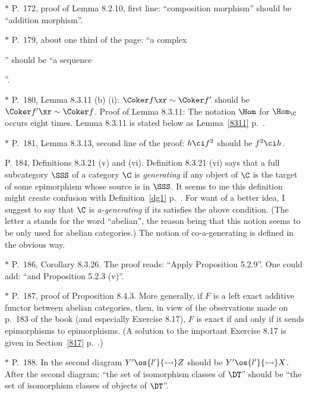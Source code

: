 \documentclass[12pt]{article}
\theoremstyle{remark}
\theoremstyle{definition}
\begin{document}
\nn$*$ P.~172, proof of Lemma 8.2.10, first line: ``composition morphism'' should be ``addition morphism''.

\nn$*$ P.~179, about one third of the page: ``a complex 
'' 
should be ``a sequence 
''.

\nn$*$ P.~180, Lemma 8.3.11 (b) (i): $\Coker f\xr\sim\Coker f'$ should be $\Coker f'\xr\sim\Coker f$. Proof of Lemma 8.3.11: The notation $\Hom$ for $\Hom_\C$ occurs eight times. Lemma 8.3.11 is stated below as Lemma~\ref{8311} p.~. 

\nn$*$ P.~181, Lemma 8.3.13, second line of the proof: $h\ci f^2$ should be $f^2\ci h$. 

\begin{s} 
P. 184, Definitions 8.3.21 (v) and (vi). Definition 8.3.21 (vi) says that a full subcategory $\SSS$ of a category $\C$ is \emph{generating} if any object of $\C$ is the target of some epimorphism whose source is in $\SSS$. It seems to me this definition might create confusion with Definition~\ref{dg1} p.~. For want of a better idea, I suggest to say that $\C$ is \emph{a-generating} if its satisfies the above condition. (The letter a stands for the word ``abelian'', the reason being that this notion seems to be only used for abelian categories.) The notion of co-a-generating is defined in the obvious way.
\end{s} 

\nn$*$ P.~186, Corollary 8.3.26. The proof reads: ``Apply Proposition 5.2.9''. One could add: ``and Proposition 5.2.3 (v)''.

\nn$*$ P.~187, proof of Proposition 8.4.3. More generally, if $F$ is a left exact additive functor between abelian categories, then, in view of the observations made on p.~183 of the book (and especially Exercise 8.17), $F$ is exact if and only if it sends epimorphisms to epimorphisms. (A solution to the important Exercise 8.17 is given in Section~\ref{817} p.~.)

\nn$*$ P.~188. In the second diagram $Y'\os{l'}{\rightarrowtail}Z$ should be $Y'\os{l'}{\rightarrowtail}X$. After the second diagram: ``the set of isomorphism classes of $\DT$'' should be ``the set of isomorphism classes of objects of $\DT$''.
\end{document}
